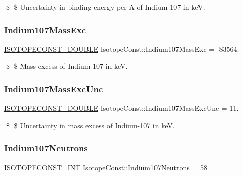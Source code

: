\$ \$ Uncertainty in binding energy per A of Indium-\/107 in keV. \mbox{\label{group___isotope_const-_indium-_in107_gabe8b63c2b205c4848ff653df11e4f35d}} 
\subsubsection{\texorpdfstring{Indium107\+Mass\+Exc}{Indium107MassExc}}
{\footnotesize\ttfamily \mbox{\hyperlink{group___isotope_const-_macros_ga8f45a7272ce02c0b4c65c44636ed719a}{I\+S\+O\+T\+O\+P\+E\+C\+O\+N\+S\+T\+\_\+\+D\+O\+U\+B\+LE}} Isotope\+Const\+::\+Indium107\+Mass\+Exc = -\/83564.}

\$ \$ Mass excess of Indium-\/107 in keV. \mbox{\label{group___isotope_const-_indium-_in107_gac3e6e06d415e64bf0142935467f272ce}} 
\subsubsection{\texorpdfstring{Indium107\+Mass\+Exc\+Unc}{Indium107MassExcUnc}}
{\footnotesize\ttfamily \mbox{\hyperlink{group___isotope_const-_macros_ga8f45a7272ce02c0b4c65c44636ed719a}{I\+S\+O\+T\+O\+P\+E\+C\+O\+N\+S\+T\+\_\+\+D\+O\+U\+B\+LE}} Isotope\+Const\+::\+Indium107\+Mass\+Exc\+Unc = 11.}

\$ \$ Uncertainty in mass excess of Indium-\/107 in keV. \mbox{\label{group___isotope_const-_indium-_in107_ga14d36a5ad5738aed94b7bfbe693535c9}} 
\subsubsection{\texorpdfstring{Indium107\+Neutrons}{Indium107Neutrons}}
{\footnotesize\ttfamily \mbox{\hyperlink{group___isotope_const-_macros_ga5f18360b3e99483a35c32d789e62621c}{I\+S\+O\+T\+O\+P\+E\+C\+O\+N\+S\+T\+\_\+\+I\+NT}} Isotope\+Const\+::\+Indium107\+Neutrons = 58}

